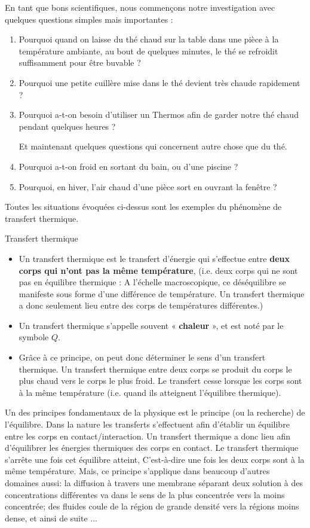 \documentclass[11pt,a4paper]{article}
\begin{document}
En tant que bons scientifiques, nous commençons notre investigation avec quelques  questions simples mais importantes :
\begin{enumerate}
    \item Pourquoi quand on laisse du thé chaud sur la table dans une pièce à la température ambiante, au bout de quelques minutes, le thé se refroidit suffisamment pour être buvable ?
    \item Pourquoi une petite cuillère mise dans le thé devient très chaude rapidement ?
    \item Pourquoi a-t-on besoin d’utiliser un Thermos afin de garder notre thé chaud pendant quelques heures ?
    
    Et maintenant quelques questions qui concernent autre chose que du thé.
    \item Pourquoi a-t-on froid en sortant du bain, ou d’une piscine ?
    \item Pourquoi, en hiver,  l’air chaud d’une pièce sort en ouvrant la fenêtre ?
\end{enumerate}

Toutes les situations évoquées ci-dessus sont les exemples du phénomène de transfert thermique. 

\begin{defn}{Transfert thermique}
\begin{itemize}
    \item Un transfert thermique est le transfert d’énergie qui s’effectue entre \textbf{deux corps qui n’ont pas la même température}, (i.e. deux corps qui ne sont pas en équilibre thermique : A l’échelle macroscopique, ce déséquilibre se manifeste sous forme d’une différence de température.  Un transfert thermique a donc seulement lieu entre des corps de températures différentes.)  
    \item Un transfert thermique s’appelle souvent « \textbf{chaleur} », et est noté par le symbole $Q$.
    \item Grâce à ce principe, on peut donc déterminer le sens d’un transfert thermique. Un transfert thermique entre deux corps se produit du corps le plus chaud vers le corps le plus froid. Le transfert cesse lorsque les corps sont à la même température (i.e. quand ils atteignent l’équilibre thermique).  
\end{itemize}
\end{defn} 

\begin{rmrq}
Un des principes fondamentaux de la physique est le principe (ou la recherche) de l’équilibre.  Dans la nature les transferts s’effectuent afin d’établir un équilibre entre les corps en contact/interaction.  Un transfert thermique a donc lieu afin d’équilibrer les énergies thermiques des corps en contact. Le transfert thermique s'arrête une fois cet équilibre atteint, C'est-à-dire une fois les deux corps sont à la même température. Mais, ce principe s'applique dans beaucoup d'autres domaines aussi: la diffusion à travers une membrane séparant deux solution à des concentrations différentes va dans le sens de la plus concentrée vers la moins concentrée; des fluides coule de la région de grande densité vers la régions moins dense, et ainsi de suite ... 
\end{rmrq}
\end{document}
